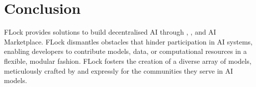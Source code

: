 \documentclass[conference]{IEEEtran}
\begin{document}




\section{Conclusion}
FLock provides solutions to build decentralised AI through \SNT, \FL, and AI Marketplace. FLock dismantles obstacles that hinder participation in AI systems, enabling developers to contribute models, data, or computational resources in a flexible, modular fashion. FLock fosters the creation of a diverse array of models, meticulously crafted by and expressly for the communities they serve in AI models.











\end{document}
